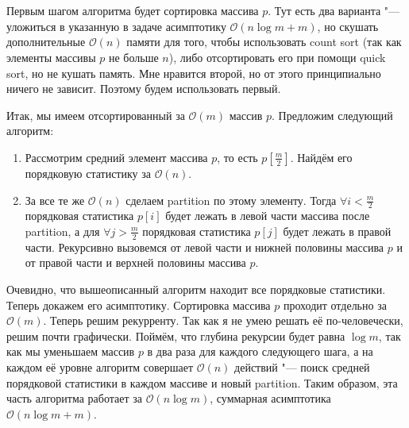 \section{}
	Первым шагом алгоритма будет сортировка массива $p$. Тут есть два варианта "--- уложиться в указанную в задаче асимптотику $\mathcal{O}(n\log m + m)$, но скушать дополнительные $\mathcal{O}(n)$ памяти для того, чтобы использовать count sort (так как элементы массивы $p$ не больше $n$), либо отсортировать его при помощи quick sort, но не кушать память. Мне нравится второй, но от этого принципиально ничего не зависит. Поэтому будем использовать первый.
	
	Итак, мы имеем отсортированный за $\mathcal{O}(m)$ массив $p$. Предложим следующий алгоритм:
	\begin{enumerate}
		\item Рассмотрим средний элемент массива $p$, то есть $p[\frac{m}{2}]$. Найдём его порядковую статистику за $\mathcal{O}(n)$.
		\item За все те же $\mathcal{O}(n)$ сделаем partition по этому элементу. Тогда $\forall i < \frac{m}{2}$ порядковая статистика $p[i]$ будет лежать в левой части массива после partition, а для $\forall j > \frac{m}{2}$ порядковая статистика $p[j]$ будет лежать в правой части. Рекурсивно вызовемся от левой части и нижней половины массива $p$ и от правой части и верхней половины массива $p$.
	\end{enumerate}
	
	Очевидно, что вышеописанный алгоритм находит все порядковые статистики. Теперь докажем его асимптотику. Сортировка массива $p$ проходит отдельно за $\mathcal{O}(m)$. Теперь решим рекурренту. Так как я не умею решать её по-человечески, решим почти графически. Поймём, что глубина рекурсии будет равна $\log m$, так как мы уменьшаем массив $p$ в два раза для каждого следующего шага, а на каждом её уровне алгоритм совершает $\mathcal{O}(n)$ действий "--- поиск средней порядковой статистики в каждом массиве и новый partition. Таким образом, эта часть алгоритма работает за $\mathcal{O}(n\log m)$, суммарная асимптотика $\mathcal{O}(n\log m + m)$. 